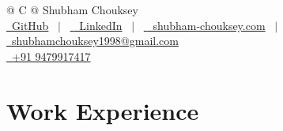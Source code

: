 \documentclass[a4paper,10pt]{article}
\newcommand{\customHeading}[1]{
    \section{\texorpdfstring{#1 \hrulefill}{}}
}
\begin{document}
\pagestyle{empty} 



\begin{tabularx}{\linewidth}{@{} C @{}}
\Huge{Shubham Chouksey} \\[7.5pt]


\href{https://github.com/ShubhamChouksey123}{\raisebox{-0.05\height}
{\textnormal{\textcolor{gray}{\faGithub}}} 
\ GitHub} 
\ $|$ \ 
\href{https://www.linkedin.com/in/contact-shubham-chouksey/}{\raisebox{-0.05\height} {\textnormal{\textcolor{linkedin}{\faLinkedin}}}   \ LinkedIn}  
\ $|$ \ 
\href{https://shubhamchouksey123.github.io/portfolio/}{\raisebox{-0.05\height}
{\textnormal{\textcolor{test}{\faGlobe}}}       
\ shubham-chouksey.com} 
\ $|$ \ 
\href{mailto:email@mysite.com}{\raisebox{-0.05\height}
{\textnormal{\textcolor{yt}{\faEnvelope}}}
\ shubhamchouksey1998@gmail.com} 
\\
\href{tel:+000000000000}{\raisebox{-0.05\height}
{\textnormal{\textcolor{gray}{\faMobile}}} 
\ +91 9479917417} 
\end{tabularx}













\customHeading{Work Experience}
\end{document}
